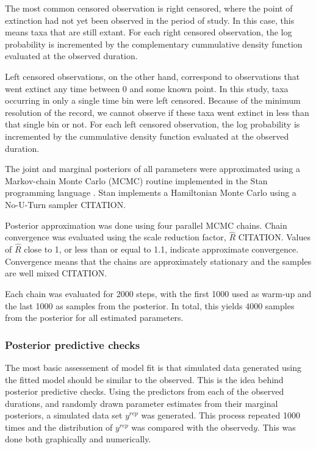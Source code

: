 \documentclass[12pt,letterpaper]{article}
\begin{document}
The most common censored observation is right censored, where the point of extinction had not yet been observed in the period of study. In this case, this means taxa that are still extant. For each right censored observation, the log probability is incremented by the complementary cummulative density function evaluated at the observed duration.

Left censored observations, on the other hand, correspond to observations that went extinct any time between 0 and some known point. In this study, taxa occurring in only a single time bin were left censored. Because of the minimum resolution of the record, we cannot observe if these taxa went extinct in less than that single bin or not. For each left censored observation, the log probability is incremented by the cummulative density function evaluated at the observed duration.

The joint and marginal posteriors of all parameters were approximated using a Markov-chain Monte Carlo (MCMC) routine implemented in the Stan programming language \citep{2014stan}. Stan implements a Hamiltonian Monte Carlo using a No-U-Turn sampler CITATION. 

Posterior approximation was done using four parallel MCMC chains. Chain convergence was evaluated using the scale reduction factor, \(\hat{R}\) CITATION. Values of \(\hat{R}\) close to 1, or less than or equal to 1.1, indicate approximate convergence. Convergence means that the chains are approximately stationary and the samples are well mixed CITATION.

Each chain was evaluated for 2000 steps, with the first 1000 used as warm-up and the last 1000 as samples from the posterior. In total, this yields 4000 samples from the posterior for all estimated parameters. 


\subsubsection{Posterior predictive checks}

The most basic assessement of model fit is that simulated data generated using the fitted model should be similar to the observed. This is the idea behind posterior predictive checks. Using the predictors from each of the observed durations, and randomly drawn parameter estimates from their marginal posteriors, a simulated data set \(y^{rep}\) was generated. This process repeated 1000 times and the distribution of \(y^{rep}\) was compared with the observed\(y\). This was done both graphically and numerically.
\end{document}

